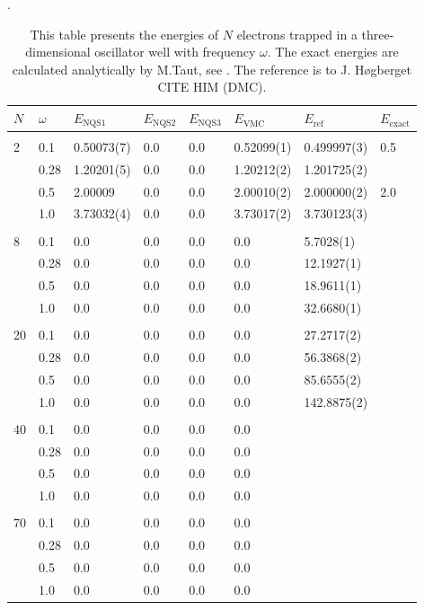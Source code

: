 \begin{table} [H]
	\caption{This table presents the energies of $N$ electrons trapped in a three-dimensional oscillator well with frequency $\omega$. The exact energies are calculated analytically by M.Taut, see \cite{taut_two_1993}. The reference is to J. Høgberget CITE HIM (DMC). }. 
	\begin{tabularx}{\textwidth}{l:l|XXXXXX} \hline\hline
		\label{tab:quantumdotswinteraction3D}
		$N$ & $\omega$ & $E_{\text{NQS1}}$ & $E_{\text{NQS2}}$ & $E_{\text{NQS3}}$ & $E_{\text{VMC}}$ & $E_{\text{ref}} $ & $E_{\text{exact}}$ \\ \hline \\
		2 & 0.1 & 0.50073(7) & 0.0 & 0.0 & 0.52099(1) & 0.499997(3) & 0.5 \\
		& 0.28 & 1.20201(5) & 0.0 & 0.0 & 1.20212(2) & 1.201725(2) & \\
		& 0.5 & 2.00009 & 0.0 & 0.0 & 2.00010(2) & 2.000000(2) & 2.0 \\
		& 1.0 & 3.73032(4) & 0.0 & 0.0 & 3.73017(2) & 3.730123(3) &  \\ \hdashline \\
		
		8 & 0.1 & 0.0 & 0.0 & 0.0 & 0.0 & 5.7028(1) \\ 
		& 0.28 & 0.0 & 0.0 & 0.0 & 0.0 & 12.1927(1) \\
		& 0.5 & 0.0 & 0.0 & 0.0 & 0.0 & 18.9611(1) \\
		& 1.0 & 0.0 & 0.0 & 0.0 & 0.0 & 32.6680(1) \\ \hdashline \\
		
		20 & 0.1 & 0.0 & 0.0 & 0.0 & 0.0 & 27.2717(2) \\ 
		& 0.28 & 0.0 & 0.0 & 0.0 & 0.0 & 56.3868(2) \\
		& 0.5 & 0.0 & 0.0 & 0.0 & 0.0 & 85.6555(2) \\
		& 1.0 & 0.0 & 0.0 & 0.0 & 0.0 & 142.8875(2) \\ \hdashline \\
		
		40 & 0.1 & 0.0 & 0.0 & 0.0 & 0.0 \\ 
		& 0.28 & 0.0 & 0.0 & 0.0 & 0.0 \\
		& 0.5 & 0.0 & 0.0 & 0.0 & 0.0 \\
		& 1.0 & 0.0 & 0.0 & 0.0 & 0.0 \\ \hdashline \\
		
		70 & 0.1 & 0.0 & 0.0 & 0.0 & 0.0 \\ 
		& 0.28 & 0.0 & 0.0 & 0.0 & 0.0 \\
		& 0.5 & 0.0 & 0.0 & 0.0 & 0.0 \\
		& 1.0 & 0.0 & 0.0 & 0.0 & 0.0 \\ \hline\hline
	\end{tabularx}
\end{table}
